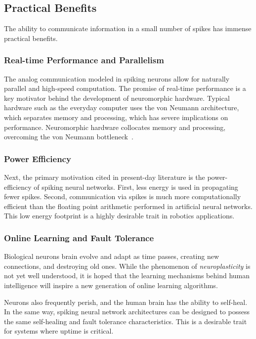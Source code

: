 \documentclass[fyp]{socreport}
\begin{document}
\subsection{Practical Benefits}

The ability to communicate information in a small number of spikes has immense
practical benefits.

\subsubsection{Real-time Performance and Parallelism}

The analog communication modeled in spiking neurons allow for naturally parallel
and high-speed computation. The promise of real-time performance is a key
motivator behind the development of neuromorphic hardware. Typical hardware such
as the everyday computer uses the von Neumann architecture, which separates
memory and processing, which has severe implications on performance.
Neuromorphic hardware collocates memory and processing, overcoming the von
Neumann bottleneck~\cite{Backus_1978}.

\subsubsection{Power Efficiency}
Next, the primary motivation cited in present-day literature is the
power-efficiency of spiking neural networks. First, less energy is used in
propagating fewer spikes. Second, communication via spikes is much more
computationally efficient than the floating point arithmetic performed in
artificial neural networks. This low energy footprint is a highly desirable
trait in robotics applications.

\subsubsection{Online Learning and Fault Tolerance}

Biological neurons brain evolve and adapt as time passes, creating new
connections, and destroying old ones. While the phenomenon of
\emph{neuroplasticity} is not yet well understood, it is hoped that the learning
mechanisms behind human intelligence will inspire a new generation of online
learning algorithms.

Neurons also frequently perish, and the human brain has the ability to
self-heal. In the same way, spiking neural network architectures can be designed
to possess the same self-healing and fault tolerance characteristics. This is a
desirable trait for systems where uptime is critical.
\end{document}
